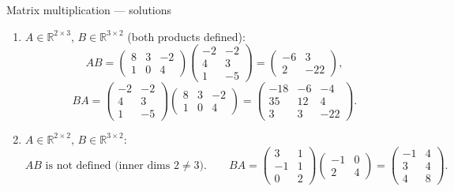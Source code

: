 \documentclass[9pt]{beamer}
\begin{document}
\begin{frame}{Matrix multiplication — solutions}
\begin{enumerate}[leftmargin=0.5cm, label=(\alph*), rightmargin=0.2cm]
\item $A\in\mathbb{R}^{2\times 3}$, $B\in\mathbb{R}^{3\times 2}$ (both products defined):
\[
AB=
\begin{pmatrix}
8&3&-2\\[2pt]1&0&4
\end{pmatrix}
\!\!
\begin{pmatrix}
-2&-2\\[2pt]4&3\\[2pt]1&-5
\end{pmatrix}
=
\begin{pmatrix}
-6&3\\[2pt]2&-22
\end{pmatrix},
\]
\[
BA=
\begin{pmatrix}
-2&-2\\[2pt]4&3\\[2pt]1&-5
\end{pmatrix}
\!\!
\begin{pmatrix}
8&3&-2\\[2pt]1&0&4
\end{pmatrix}
=
\begin{pmatrix}
-18&-6&-4\\[2pt]35&12&4\\[2pt]3&3&-22
\end{pmatrix}.
\]
\medskip

\item $A\in\mathbb{R}^{2\times 2}$, $B\in\mathbb{R}^{3\times 2}$:
\[
AB \text{ is not defined (inner dims $2\neq 3$).}\qquad
BA=
\begin{pmatrix}
3&1\\[2pt]-1&1\\[2pt]0&2
\end{pmatrix}
\!\!
\begin{pmatrix}
-1&0\\[2pt]2&4
\end{pmatrix}
=
\begin{pmatrix}
-1&4\\[2pt]3&4\\[2pt]4&8
\end{pmatrix}.
\]
\medskip


\end{enumerate}
\end{frame}
\end{document}
